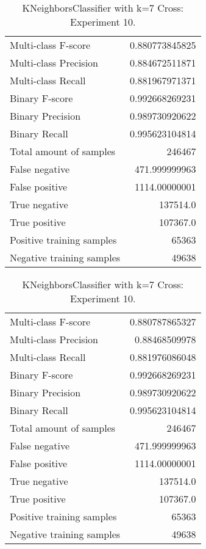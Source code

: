 \begin{table}[H]
\begin{minipage}{0.5\textwidth}
\caption{KNeighborsClassifier with k=7 Cross: Experiment 9.}
\centering
\begin{tabular}{l r}
\toprule
Multi-class F-score & 0.880773845825 \\
Multi-class Precision & 0.884672511871 \\
Multi-class Recall & 0.881967971371 \\
\midrule
Binary F-score & 0.992668269231 \\
Binary Precision & 0.989730920622 \\
Binary Recall & 0.995623104814 \\
\midrule
Total amount of samples & 246467 \\
False negative & 471.999999963 \\
False positive & 1114.00000001 \\
True negative & 137514.0 \\
True positive & 107367.0 \\
\midrule
Positive training samples & 65363 \\
Negative training samples & 49638 \\
\bottomrule
\end{tabular}
\end{minipage}
\hfillx
\begin{minipage}{0.5\textwidth}
\caption{KNeighborsClassifier with k=7 Cross: Experiment 10.}
\centering
\begin{tabular}{l r}
\toprule
Multi-class F-score & 0.880787865327 \\
Multi-class Precision & 0.88468509978 \\
Multi-class Recall & 0.881976086048 \\
\midrule
Binary F-score & 0.992668269231 \\
Binary Precision & 0.989730920622 \\
Binary Recall & 0.995623104814 \\
\midrule
Total amount of samples & 246467 \\
False negative & 471.999999963 \\
False positive & 1114.00000001 \\
True negative & 137514.0 \\
True positive & 107367.0 \\
\midrule
Positive training samples & 65363 \\
Negative training samples & 49638 \\
\bottomrule
\end{tabular}
\end{minipage}
\end{table}
